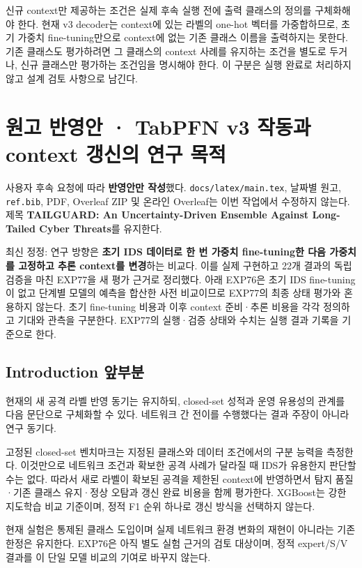 신규 context만 제공하는 조건은 실제 후속 실행 전에 출력 클래스의 정의를 구체화해야 한다. 현재 v3 decoder는 context에 있는 라벨의 one-hot 벡터를 가중합하므로, 초기 가중치 fine-tuning만으로 context에 없는 기존 클래스 이름을 출력하지는 못한다. 기존 클래스도 평가하려면 그 클래스의 context 사례를 유지하는 조건을 별도로 두거나, 신규 클래스만 평가하는 조건임을 명시해야 한다. 이 구분은 실행 완료로 처리하지 않고 설계 검토 사항으로 남긴다.



\section{원고 반영안 · TabPFN v3 작동과 context 갱신의 연구 목적}
사용자 후속 요청에 따라 \textbf{반영안만 작성}했다. \texttt{docs/\allowbreak{}\allowbreak{}lat\allowbreak{}ex/\allowbreak{}\allowbreak{}main.\allowbreak{}tex}, 날짜별 원고, \texttt{ref.\allowbreak{}bib}, PDF, Overleaf ZIP 및 온라인 Overleaf는 이번 작업에서 수정하지 않는다. 제목 \textbf{TAILGUARD: An Uncertainty-Driven Ensemble Against Long-Tailed Cyber Threats}를 유지한다.

최신 정정: 연구 방향은 \textbf{초기 IDS 데이터로 한 번 가중치 fine-tuning한 다음 가중치를 고정하고 추론 context를 변경}하는 비교다. 이를 실제 구현하고 22개 결과의 독립 검증을 마친 EXP77을 새 평가 근거로 정리했다. 아래 EXP76은 초기 IDS fine-tuning이 없고 단계별 모델의 예측을 합산한 사전 비교이므로 EXP77의 최종 상태 평가와 혼용하지 않는다. 초기 fine-tuning 비용과 이후 context 준비·추론 비용을 각각 정의하고 기대와 관측을 구분한다. EXP77의 실행·검증 상태와 수치는 실행 결과 기록을 기준으로 한다.

\subsection{Introduction 앞부분}
현재의 새 공격 라벨 반영 동기는 유지하되, closed-set 성적과 운영 유용성의 관계를 다음 문단으로 구체화할 수 있다. 네트워크 간 전이를 수행했다는 결과 주장이 아니라 연구 동기다.

고정된 closed-set 벤치마크는 지정된 클래스와 데이터 조건에서의 구분 능력을 측정한다. 이것만으로 네트워크 조건과 확보한 공격 사례가 달라질 때 IDS가 유용한지 판단할 수는 없다. 따라서 새로 라벨이 확보된 공격을 제한된 context에 반영하면서 탐지 품질·기존 클래스 유지·정상 오탐과 갱신 완료 비용을 함께 평가한다. XGBoost는 강한 지도학습 비교 기준이며, 정적 F1 순위 하나로 갱신 방식을 선택하지 않는다.



현재 실험은 통제된 클래스 도입이며 실제 네트워크 환경 변화의 재현이 아니라는 기존 한정은 유지한다. EXP76은 아직 별도 실험 근거의 검토 대상이며, 정적 expert/\allowbreak{}S/\allowbreak{}V 결과를 이 단일 모델 비교의 기여로 바꾸지 않는다.

